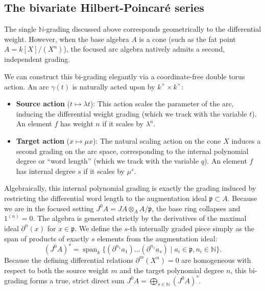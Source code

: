 \documentclass[a4paper, 12pt]{amsart}
\theoremstyle{definition}
\theoremstyle{remark}
\begin{document}
\subsection{The bivariate Hilbert-Poincar\'{e} series}
\label{sec:bivariate-series}

The single $\mathbb{N}$-grading discussed above corresponds geometrically to the differential weight. However, when the base algebra $A$ is a cone (such as the fat point $A = k[X]/(X^n)$), the focused arc algebra natively admits a second, independent grading. 

We can construct this bi-grading elegantly via a coordinate-free double torus action. An arc $\gamma(t)$ is naturally acted upon by $k^\times \times k^\times$:
\begin{itemize}
    \item \textbf{Source action} ($t \mapsto \lambda t$): This action scales the parameter of the arc, inducing the differential weight grading (which we track with the variable $t$). An element $f$ has weight $n$ if it scales by $\lambda^n$.
    \item \textbf{Target action} ($x \mapsto \mu x$): The natural scaling action on the cone $X$ induces a second grading on the arc space, corresponding to the internal polynomial degree or ``word length'' (which we track with the variable $q$). An element $f$ has internal degree $s$ if it scales by $\mu^s$.
\end{itemize}

Algebraically, this internal polynomial grading is exactly the grading induced by restricting the differential word length to the augmentation ideal $\mathfrak{p} \subset A$. Because we are in the focused setting $J^0A = JA \otimes_A A/\mathfrak{p}$, the base ring collapses and $1^{(n)} = 0$. The algebra is generated strictly by the derivatives of the maximal ideal $\partial^n(x)$ for $x \in \mathfrak{p}$. We define the $s$-th internally graded piece simply as the span of products of exactly $s$ elements from the augmentation ideal:
\begin{equation*}
  (J^0A)^s = \operatorname{span}_k \{ (\partial^{n_1}a_1)\dots(\partial^{n_s}a_s) \mid a_i \in \mathfrak{p}, n_i \in \mathbb{N} \}.
\end{equation*}
Because the defining differential relations $\partial^m(X^n) = 0$ are homogeneous with respect to both the source weight $m$ and the target polynomial degree $n$, this bi-grading forms a true, strict direct sum $J^0A = \bigoplus_{s \in \mathbb{N}} (J^0A)^s$. 
\end{document}
